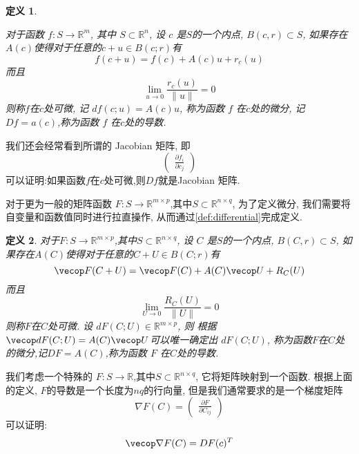 \documentclass{ctexbook}
\newtheorem{definition}{定义}
\begin{document}
\begin{definition}\label{def:diff_f}

	对于函数 $f : S \rightarrow \mathbb R^m$, 其中 $S\subset \mathbb R^n $, 设 $c$ 是$S$的一个内点, $B(c,r)\subset S$, 如果存在$A(c)$使得对于任意的$c+u\in B(c;r)$有
	\begin{equation*}
  f(c+u) = f(c) + A(c)u + r_c(u)
\end{equation*}
 而且
 \begin{equation*}
  \lim_{u\rightarrow 0} \frac{r_c(u)}{\|u\|} = 0
\end{equation*}
则称$f$在$c$处可微,
记 $df(c;u) = A(c)u$, 称为函数 $f$ 在$c$处的微分, 记$Df = a(c)$,称为函数 $f$ 在$c$处的导数.
\end{definition}

我们还会经常看到所谓的 Jacobian 矩阵, 即
\begin{equation*}
  \begin{pmatrix}
  	\frac{\partial f_i}{\partial c_j}
  \end{pmatrix}
\end{equation*}
可以证明:如果函数$f$在$c$处可微,则$Df$就是Jacobian 矩阵.


对于更为一般的矩阵函数 $F : S\rightarrow \mathbb R^{m\times p}$,其中$S\subset \mathbb R^{n\times q}$, 为了定义微分, 我们需要将自变量和函数值同时进行拉直操作, 从而通过\ref{def:differential}完成定义.

\begin{definition}\label{def:diff_F}
	对于$F : S\rightarrow \mathbb R^{m\times p}$,其中$S\subset \mathbb R^{n\times q}$, 设 $C$ 是$S$的一个内点, $B(C,r)\subset S$, 如果存在$A(C)$使得对于任意的$C+U\in B(C;r)$有
	\begin{equation*}
  \vecop F(C+U) = \vecop F(C) + A(C)\vecop U +  R_C(U)
\end{equation*}
而且 $$\lim_{U\rightarrow 0}\frac{R_C(U)}{\|U\|}=0$$
 则称$F$在$C$处可微.
设 $dF(C;U)\in \mathbb R^{m\times p}$, 则 根据$\vecop dF(C;U) = A(C)\vecop U$可以唯一确定出 $dF(C;U)$, 称为函数$F$在$C$处的微分,记$DF = A(C)$,称为函数 $F$ 在$C$处的导数.
\end{definition}

我们考虑一个特殊的  $F:S\rightarrow \mathbb R$,其中$S\subset \mathbb R^{n\times q}$, 它将矩阵映射到一个函数. 根据上面的定义, $F$的导数是一个长度为$nq$的行向量, 但是我们通常要求的是一个梯度矩阵
\begin{equation*}
  \nabla F(C) = 
  \begin{pmatrix}
  	\frac{\partial F}{\partial C_{ij}}
  \end{pmatrix}
\end{equation*}
可以证明:
\begin{equation*}
  \vecop \nabla F(C) = DF(c)^T
\end{equation*}
\end{document}
